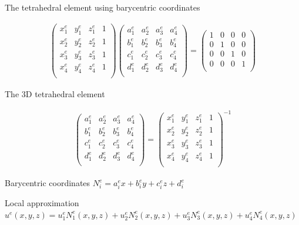 \documentclass[handout]{beamer}
{
\usepackage{fullpage}
\usepackage{hyperref}
\usepackage{amssymb} 
}
\newcommand{\pmat}[1]{\begin{pmatrix}#1\end{pmatrix}}
\begin{document}
\begin{frame}{The tetrahedral element using barycentric coordinates}
\begin{minipage}{0.65\textwidth}
\begin{align*}
\pmat{x^e_1 & y^e_1 & z^e_1 & 1     \\
      x^e_2 & y^e_2 & z^e_2 & 1     \\
      x^e_3 & y^e_3 & z^e_3 & 1     \\
      x^e_4 & y^e_4 & z^e_4 & 1     \\
} 
\pmat{a^e_1 & a^e_2 & a^e_3 & a^e_4 \\
      b^e_1 & b^e_2 & b^e_3 & b^e_4 \\
      c^e_1 & c^e_2 & c^e_3 & c^e_4 \\
      d^e_1 & d^e_2 & d^e_3 & d^e_4 \\
}
=
\pmat{1     & 0     & 0  & 0   \\
      0     & 1     & 0  & 0   \\
      0     & 0     & 1  & 0   \\
      0     & 0     & 0  & 1   \\
}
\end{align*}
\end{minipage}



\end{frame}


\begin{frame}{The 3D tetrahedral element}
\centering
\begin{minipage}{0.65\textwidth}
\begin{align*}
\pmat{a^e_1 & a^e_2 & a^e_3 & a^e_4 \\
      b^e_1 & b^e_2 & b^e_3 & b^e_4 \\
      c^e_1 & c^e_2 & c^e_3 & c^e_4 \\
      d^e_1 & d^e_2 & d^e_3 & d^e_4 \\
}
=
\pmat{x^e_1 & y^e_1 & z^e_1 & 1     \\
      x^e_2 & y^e_2 & z^e_2 & 1     \\
      x^e_3 & y^e_3 & z^e_3 & 1     \\
      x^e_4 & y^e_4 & z^e_4 & 1     \\
}^{-1} 
\end{align*}
\end{minipage}

\bigskip

\begin{minipage}{0.45\textwidth}
\begin{block}{Barycentric coordinates}
$N_i^e = a^e_i x + b^e_i y + c^e_i z + d^e_i$
\end{block}
\end{minipage}

\bigskip

\begin{minipage}{\textwidth}
\begin{block}{Local approximation}
$u^e(x,y,z) = u^e_1 N^e_1(x,y,z) + u^e_2 N^e_2(x,y,z) + u^e_3 N^e_3(x,y,z) + u^e_4 N^e_4(x,y,z)$
\end{block}
\end{minipage}

\end{frame}
\end{document}
